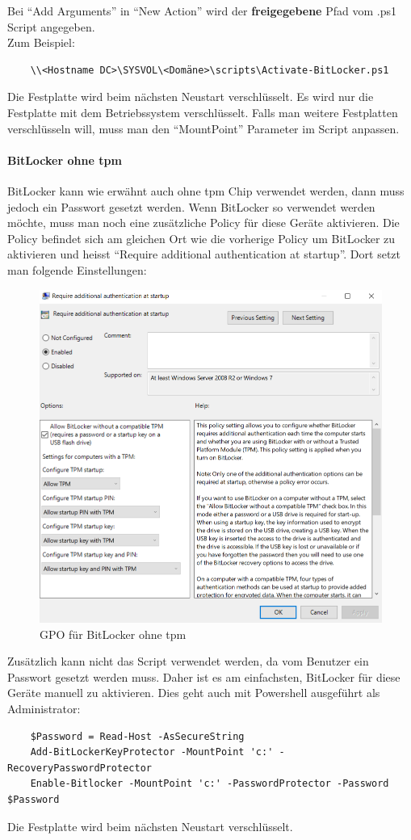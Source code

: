 Bei ``Add Arguments'' in ``New Action'' wird der \textbf{freigegebene} Pfad vom .ps1 Script angegeben.\\
Zum Beispiel:
\begin{lstlisting}
    \\<Hostname DC>\SYSVOL\<Domäne>\scripts\Activate-BitLocker.ps1
\end{lstlisting}

Die Festplatte wird beim nächsten Neustart verschlüsselt.
Es wird nur die Festplatte mit dem Betriebssystem verschlüsselt.
Falls man weitere Festplatten verschlüsseln will, muss man den ``MountPoint'' Parameter im Script anpassen.

\paragraph{BitLocker ohne \acrshort{tpm}}
BitLocker kann wie erwähnt auch ohne \acrshort{tpm} Chip verwendet werden, dann muss jedoch ein Passwort gesetzt werden.
Wenn BitLocker so verwendet werden möchte, muss man noch eine zusätzliche Policy für diese Geräte aktivieren.
Die Policy befindet sich am gleichen Ort wie die vorherige Policy um BitLocker zu aktivieren und heisst ``Require additional authentication at startup''.
Dort setzt man folgende Einstellungen:
\begin{figure}[H]
    \centering
    \includegraphics[width=0.7\linewidth]{../img/Encryption/computers-without-tpm.png}
    \caption{GPO für BitLocker ohne \acrshort{tpm}}
\end{figure}
Zusätzlich kann nicht das Script verwendet werden, da vom Benutzer ein Passwort gesetzt werden muss.
Daher ist es am einfachsten, BitLocker für diese Geräte manuell zu aktivieren.
Dies geht auch mit Powershell ausgeführt als Administrator:
\begin{lstlisting}
    $Password = Read-Host -AsSecureString
    Add-BitLockerKeyProtector -MountPoint 'c:' -RecoveryPasswordProtector
    Enable-Bitlocker -MountPoint 'c:' -PasswordProtector -Password $Password
\end{lstlisting}
Die Festplatte wird beim nächsten Neustart verschlüsselt.


